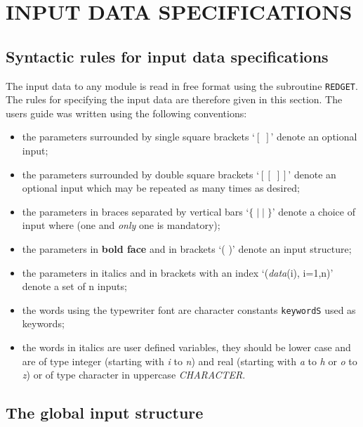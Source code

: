 \section{INPUT DATA SPECIFICATIONS}

\subsection{Syntactic rules for input data specifications}

The input data to any module is read in free format using the subroutine {\tt REDGET}. The rules for specifying the input data are therefore given in this section. The users guide was written using the following conventions:

\begin{itemize}

\item	the parameters surrounded by single square brackets `$[\;]$' denote an optional input;

\item	the parameters surrounded by double square brackets `$[[\;]]$' denote an optional input which may be repeated as many times as desired;

\item	the parameters in braces separated by vertical bars `$\{\; |\; |\; \}$' denote a choice of input where (one and {\sl only} one is mandatory);

\item	the parameters in {\bf{bold face}} and in brackets `( )' denote an input structure;

\item	the parameters in italics and in brackets with an index `({\it data}(i), i=1,n)' denote a set of n inputs;

\item	the words using the typewriter font are character constants {\tt keywordS} used as keywords;

\item	the words in italics are user defined variables, they should be lower case and are of type integer (starting with {\it i} to {\it n}) and real (starting with {\it a} to {\it h} or {\it o} to {\it z})
or of type character in uppercase {\it CHARACTER}.

\end{itemize}

\subsection{The global input structure}

